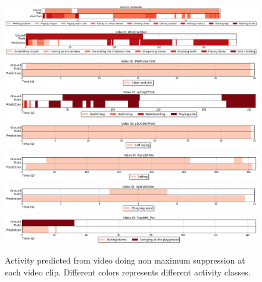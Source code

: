 \begin{figure}[H]
\begin{center}
\includegraphics[width=1\linewidth]{img/results/activity_detection_multiple/activity_detection_sample_0}
\includegraphics[width=1\linewidth]{img/results/activity_detection_multiple/activity_detection_sample_1}
\includegraphics[width=1\linewidth]{img/results/activity_detection_multiple/activity_detection_sample_2}
\includegraphics[width=1\linewidth]{img/results/activity_detection_multiple/activity_detection_sample_3}
\includegraphics[width=1\linewidth]{img/results/activity_detection_multiple/activity_detection_sample_4}
\includegraphics[width=1\linewidth]{img/results/activity_detection_multiple/activity_detection_sample_5}
\includegraphics[width=1\linewidth]{img/results/activity_detection_multiple/activity_detection_sample_6}
\includegraphics[width=1\linewidth]{img/results/activity_detection_multiple/activity_detection_sample_7}
\end{center}
\caption{Activity predicted from video doing non maximum suppression at each video clip. Different colors represents different activity classes.}
\label{fig:results_visualization_detection_classes}
\end{figure}
